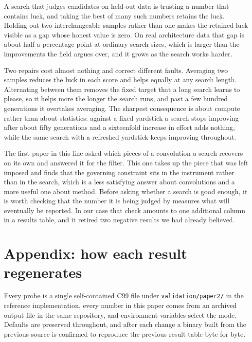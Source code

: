\documentclass[11pt]{article}
\begin{document}
A search that judges candidates on held-out data is trusting a number that contains luck, and taking the
best of many such numbers retains the luck. Holding out two interchangeable samples rather than one
makes the retained luck visible as a gap whose honest value is zero. On real architecture data that gap
is about half a percentage point at ordinary search sizes, which is larger than the improvements the
field argues over, and it grows as the search works harder.

Two repairs cost almost nothing and correct different faults. Averaging two samples reduces the luck in
each score and helps equally at any search length. Alternating between them removes the fixed target
that a long search learns to please, so it helps more the longer the search runs, and past a few hundred
generations it overtakes averaging. The sharpest consequence is about compute rather than about
statistics: against a fixed yardstick a search stops improving after about fifty generations and a
sixteenfold increase in effort adds nothing, while the same search with a refreshed yardstick keeps
improving throughout.

The first paper in this line asked which pieces of a convolution a search recovers on its own and
answered it for the filter. This one takes up the piece that was left imposed and finds that the
governing constraint sits in the instrument rather than in the search, which is a less satisfying answer
about convolutions and a more useful one about method. Before asking whether a search is good enough, it
is worth checking that the number it is being judged by measures what will eventually be reported. In our
case that check amounts to one additional column in a results table, and it retired two negative results
we had already believed.

\section*{Appendix: how each result regenerates}

Every probe is a single self-contained C99 file under \texttt{validation/paper2/} in the reference
implementation, every number in this paper comes from an archived output file in the same repository, and
environment variables select the mode. Defaults are preserved throughout, and after each change a binary
built from the previous source is confirmed to reproduce the previous result table byte for byte.
\end{document}
